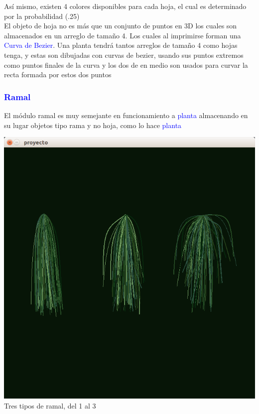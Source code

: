 \documentclass[11pt,a4paper]{article}
\begin{document}
			Así mismo, existen 4 colores disponibles para cada hoja, el cual es determinado por la probabilidad (.25)\\ 
			El objeto de hoja no es más que un conjunto de puntos en 3D los cuales son almacenados en un arreglo de tamaño 4. Los cuales al imprimirse forman una \textcolor{blue}{Curva de Bezier}. Una planta tendrá tantos arreglos de tamaño 4 como hojas tenga, y estas son dibujadas con curvas de bezier, usando sus puntos extremos como puntos finales de la curva y los dos de en medio son usados para curvar la recta formada por estos dos puntos

		\subsubsection{\textcolor{blue}{Ramal}}

			El módulo ramal es muy semejante en funcionamiento a \textcolor{blue}{planta} almacenando en su lugar objetos tipo rama y no hoja, como lo hace \textcolor{blue}{planta}

			\begin{center}
			\includegraphics[scale=.4]{CAP9}\\
			{\tiny Tres tipos de ramal, del 1 al 3}
			\end{center}
\end{document}
